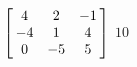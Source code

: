 {$\left[\hskip -3pt \begin{array}{ccc} 4&2&-1\\  -4&1&4
\\  0&-5&5\end{array}\hskip -3pt \right]$} 
{$10$}



  

